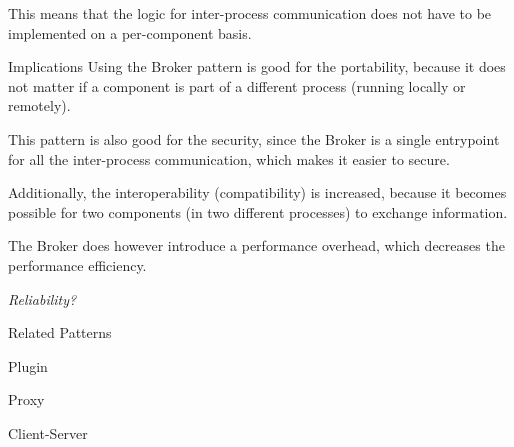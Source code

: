 \begin{patdescription}
This means that the logic for inter-process communication does not have to be implemented on a per-component basis.

\item [Implications]
Using the Broker pattern is good for the portability, because it does not matter if a component is part of a different process (running locally or remotely).

This pattern is also good for the security, since the Broker is a single entrypoint for all the inter-process communication, which makes it easier to secure.

Additionally, the interoperability (compatibility) is increased, because it becomes possible for two components (in two different processes) to exchange information. 

The Broker does however introduce a performance overhead, which decreases the performance efficiency.

\textit{Reliability?}


\item [Related Patterns]
\begin{mynesteditemlist}
\item Plugin
\item Proxy
\item Client-Server
\end{mynesteditemlist}

\end{patdescription}
